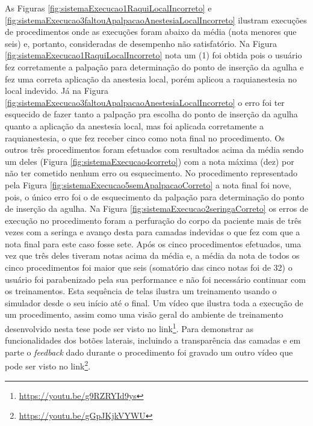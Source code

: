 As Figuras \ref{fig:sistemaExecucao1RaquiLocalIncorreto} e \ref{fig:sistemaExecucao3faltouApalpacaoAnestesiaLocalIncorreto} ilustram execuções de procedimentos onde as execuções foram abaixo da média (nota menores que seis) e, portanto, consideradas de desempenho não satisfatório. Na Figura \ref{fig:sistemaExecucao1RaquiLocalIncorreto}  nota um (1) foi obtida pois o usuário fez corretamente a palpação para determinação do ponto de inserção da agulha e fez uma correta aplicação da anestesia local, porém aplicou a raquianestesia no local indevido. Já na Figura \ref{fig:sistemaExecucao3faltouApalpacaoAnestesiaLocalIncorreto} o erro foi ter esquecido de fazer tanto a palpação pra escolha do ponto de inserção da agulha quanto a aplicação da anestesia local, mas foi aplicada corretamente a raquianestesia, o que fez receber cinco como nota final no procedimento. Os outros três procedimentos foram efetuados com resultados acima da média sendo um deles (Figura \ref{fig:sistemaExecucao4correto}) com a nota máxima (dez) por não ter cometido nenhum erro ou esquecimento. No procedimento representado pela Figura \ref{fig:sistemaExecucao5semApalpacaoCorreto} a nota final foi nove, pois, o único erro foi o de esquecimento da palpação para determinação do ponto de inserção da agulha. Na Figura \ref{fig:sistemaExecucao2seringaCorreto} os erros de execução no procedimento foram a perfuração do corpo da paciente mais de três vezes com a seringa e avanço desta para camadas indevidas o que fez com que a nota final para este caso fosse sete. 
Após os cinco procedimentos efetuados, uma vez que três deles tiveram notas acima da média e, a média da nota de todos os cinco procedimentos foi maior que seis (somatório das cinco notas foi de 32) o usuário foi parabenizado pela sua performance e não foi necessário continuar com os treinamentos. Esta sequência de telas ilustra um treinamento usando o simulador desde o seu início até o final. Um vídeo que ilustra toda a execução de um procedimento, assim como uma visão geral do ambiente de treinamento desenvolvido nesta tese pode ser visto no link\footnote{\url{https://youtu.be/g9RZRYId9ys}}. Para demonstrar as funcionalidades dos botões laterais, incluindo a transparência das camadas e em parte o \textit{feedback} dado durante o procedimento foi gravado um outro vídeo que pode ser visto no link\footnote{\url{https://youtu.be/gGpJKjkVYWU}}.

